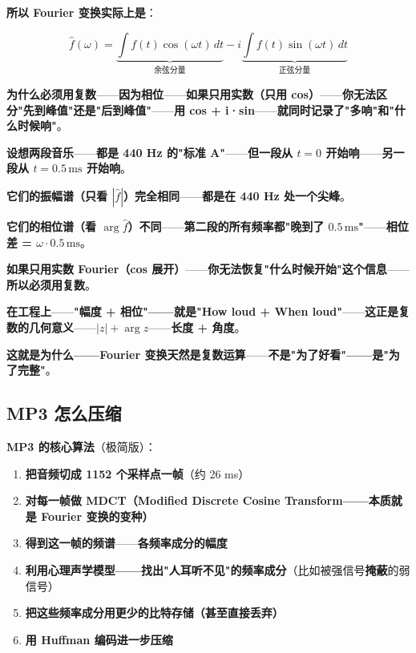 \textbf{所以 Fourier 变换实际上是}：

\[
\hat{f}(\omega) = \underbrace{\int f(t)\cos(\omega t)\, dt}_{\text{余弦分量}} - i\underbrace{\int f(t)\sin(\omega t)\, dt}_{\text{正弦分量}}
\]

\textbf{为什么必须用复数}——\textbf{因为\textbf{相位}}——\textbf{如果只用实数（只用 cos）}——\textbf{你无法区分\textbf{"先到峰值"还是"后到峰值"}}——\textbf{用 cos + i·sin}——\textbf{就同时记录了\textbf{"多响"和"什么时候响"}}。

\begin{tcolorbox}[ahabox={Aha: Fourier 变换为什么必须用复数}]
\textbf{设想两段音乐}——\textbf{都是 440 Hz 的"标准 A"}——\textbf{但一段从 $t=0$ 开始响}——\textbf{另一段从 $t=0.5\,\text{ms}$ 开始响}。

\medskip

\textbf{它们的\textbf{振幅谱（只看 $|\hat{f}|$）}\textbf{完全相同}}——\textbf{都是在 440 Hz 处一个尖峰}。

\medskip

\textbf{它们的\textbf{相位谱（看 $\arg \hat{f}$）}\textbf{不同}}——\textbf{第二段的所有频率都"晚到了 $0.5\,\text{ms}$"}——\textbf{相位差 = $\omega \cdot 0.5\,\text{ms}$}。

\medskip

\textbf{如果只用实数 Fourier（cos 展开）}——\textbf{你无法恢复"什么时候开始"这个信息}——\textbf{所以必须用复数}。

\medskip

\textbf{在工程上}——\textbf{"幅度 + 相位"——就是"How loud + When loud"}——\textbf{这正是复数的几何意义}——\textbf{$|z| + \arg z$}——\textbf{长度 + 角度}。

\medskip

\textbf{这就是为什么——Fourier 变换天然是复数运算}——\textbf{不是"为了好看"——是"为了完整"}。
\end{tcolorbox}

\subsection{MP3 怎么压缩}

\textbf{MP3 的核心算法}（极简版）：

\begin{enumerate}
\item \textbf{把音频切成 \textbf{1152 个采样点}一帧}（约 26 ms）
\item \textbf{对每一帧做 \textbf{MDCT}（Modified Discrete Cosine Transform——本质就是 Fourier 变换的变种）}
\item \textbf{得到这一帧的\textbf{频谱}}——\textbf{各频率成分的幅度}
\item \textbf{利用\textbf{心理声学模型}——找出"人耳听不见"的频率成分}（比如被强信号\textbf{掩蔽}的弱信号）
\item \textbf{把这些频率成分\textbf{用更少的比特存储}（甚至直接丢弃）}
\item \textbf{用 Huffman 编码进一步压缩}
\end{enumerate}

